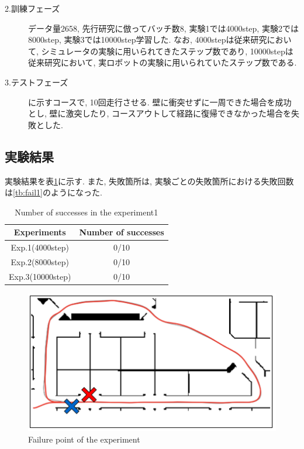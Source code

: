 \newpage
\begin{description}
  \item[2.訓練フェーズ] データ量2658, 先行研究に倣ってバッチ数8, 実験1では4000step, 実験2では8000step, 実験3では10000step学習した. なお, 4000stepは従来研究において, シミュレータの実験に用いられてきたステップ数であり, 10000stepは従来研究において, 実ロボットの実験に用いられていたステップ数である. 
\end{description}

\begin{description}
  \item[3.テストフェーズ]に示すコースで, 10回走行させる. 壁に衝突せずに一周できた場合を成功とし, 壁に激突したり, コースアウトして経路に復帰できなかった場合を失敗とした.
\end{description}

\subsection{実験結果}
実験結果を表\ref{tb:exp1}に示す. また, 失敗箇所は, 実験ごとの失敗箇所における失敗回数は\ref{tb:fail1}のようになった. 

\begin{table}[h]
  \centering
  \begin{tabular}{|c|c|} \hline
    Experiments & Number of successes \\ \hline
    Exp.1(4000step) & 0/10 \\ \hline
    Exp.2(8000step) & 0/10 \\ \hline
    Exp.3(10000step) & 0/10 \\ \hline
  \end{tabular}
  \caption{Number of successes in the experiment1}
  \label{tb:exp1}
\end{table}

\begin{figure}[h]
  \centering
  \includegraphics[keepaspectratio, scale=0.5]{images/result1.png}
  \caption{Failure point of the experiment}
  \label{Fig:result1}
  \end{figure}


